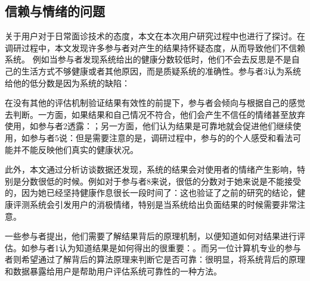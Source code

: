 \subsection{信赖与情绪的问题}
关于用户对于日常面诊技术的态度，本文在本次用户研究过程中也进行了探讨。在调研过程中，本文发现许多参与者对产生的结果持怀疑态度，从而导致他们不信赖系统。
例如当参与者发现系统给出的健康分数较低时，他们不会去反思是不是自己的生活方式不够健康或者其他原因，而是质疑系统的准确性。参与者3认为系统给他的低分数是因为系统的缺陷：

在没有其他的评估机制验证结果有效性的前提下，参与者会倾向与根据自己的感觉去判断。一方面，如果结果和自己情况不符合，他们会产生不信任的情绪甚至放弃使用，如参与者2透露：；另一方面，他们认为结果是可靠地就会促进他们继续使用，如参与者5说：但是需要注意的是，调研过程中，参与的的个人感受和看法可能并不能反映他们真实的健康状况。

此外，本文通过分析访谈数据还发现，系统的结果会对使用者的情绪产生影响，特别是分数很低的时候。例如对于参与者8来说，很低的分数对于她来说是不能接受的，因为她已经坚持健康作息很长一段时间了：这也验证了之前的研究\cite{Toscos2013Designing}的结论，健康评测系统会引发用户的消极情绪，特别是当系统给出负面结果的时候需要非常注意。

一些参与者提出，他们需要了解结果背后的原理机制，以便知道如何对结果进行评估。如参与者1认为知道结果是如何得出的很重要：。而另一位计算机专业的参与者则希望通过了解背后的算法原理来判断它是否可靠：很明显，将系统背后的原理和数据暴露给用户是帮助用户评估系统可靠性的一种方法。

